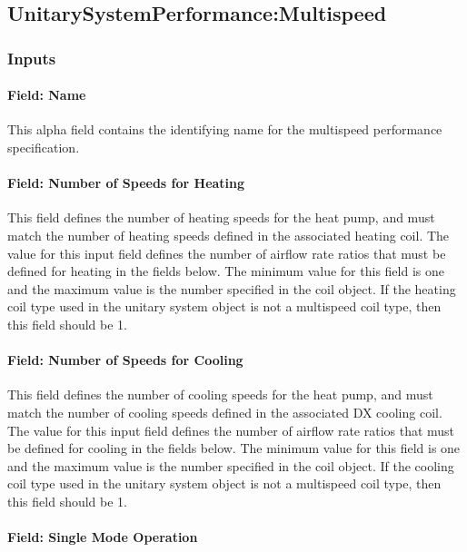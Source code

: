 \subsection{UnitarySystemPerformance:Multispeed}\label{unitarysystemperformancemultispeed}

\subsubsection{Inputs}\label{inputs-1-046}

\paragraph{Field: Name}\label{field-name-1-045}

This alpha field contains the identifying name for the multispeed performance specification.

\paragraph{Field: Number of Speeds for Heating}\label{field-number-of-speeds-for-heating}

This field defines the number of heating speeds for the heat pump, and must match the number of heating speeds defined in the associated heating coil. The value for this input field defines the number of airflow rate ratios that must be defined for heating in the fields below. The minimum value for this field is one and the maximum value is the number specified in the coil object. If the heating coil type used in the unitary system object is not a multispeed coil type, then this field should be 1.

\paragraph{Field: Number of Speeds for Cooling}\label{field-number-of-speeds-for-cooling-000}

This field defines the number of cooling speeds for the heat pump, and must match the number of cooling speeds defined in the associated DX cooling coil. The value for this input field defines the number of airflow rate ratios that must be defined for cooling in the fields below. The minimum value for this field is one and the maximum value is the number specified in the coil object. If the cooling coil type used in the unitary system object is not a multispeed coil type, then this field should be 1.

\paragraph{Field: Single Mode Operation}\label{field-single-mode-operation}

